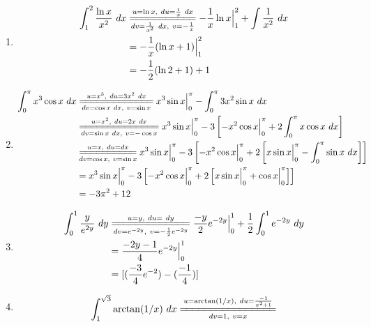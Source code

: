 \documentclass[a4]{article}
\begin{document}
\begin{enumerate}[label={\bf{}\arabic*}.]
\item%
	\begin{align*}
	\int_1^2\frac{\ln x}{x^2}\ dx&\overset{u=\ln x,\ du=\frac{1}{x}\ dx}{\underset{dv=\frac{1}{x^2}\ dx,\ v=-\frac{1}{x}}{=\joinrel=\joinrel=\joinrel=\joinrel=\joinrel=\joinrel=\joinrel=\joinrel=\joinrel=\joinrel=}}-\frac{1}{x}\ln x\Big|_1^2+\int\frac{1}{x^2}\ dx\\
	&=-\frac{1}{x}(\ln x+1)\Big|_1^2\\
	&=-\frac{1}{2}(\ln2+1)+1
	\end{align*}

\item%
	\begin{align*}
	\int_0^\pi x^3\cos x\ dx&\overset{u=x^3,\ du=3x^2\ dx}{\underset{dv=\cos x\ dx,\ v=\sin x}{=\joinrel=\joinrel=\joinrel=\joinrel=\joinrel=\joinrel=\joinrel=\joinrel=\joinrel=\joinrel=\joinrel=\joinrel=}}x^3\sin x\Big|_0^\pi-\int_0^\pi3x^2\sin x\ dx\\
	&\overset{u=x^2,\ du=2x\ dx}{\underset{dv=\sin x\ dx,\ v=-\cos x}{=\joinrel=\joinrel=\joinrel=\joinrel=\joinrel=\joinrel=\joinrel=\joinrel=\joinrel=\joinrel=\joinrel=\joinrel=\joinrel=}}x^3\sin x\Big|_0^\pi-3\left[-x^2\cos x\Big|_0^\pi+2\int_0^\pi x\cos x\ dx\right]\\
	&\overset{u=x,\ du=dx}{\underset{dv=\cos x,\ v=\sin x}{=\joinrel=\joinrel=\joinrel=\joinrel=\joinrel=\joinrel=\joinrel=\joinrel=\joinrel=}}x^3\sin x\Big|_0^\pi-3\left[-x^2\cos x\Big|_0^\pi+2\left[x\sin x\Big|_0^\pi-\int_0^\pi\sin x\ dx\right]\right]\\
	&=x^3\sin x\Big|_0^\pi-3\left[-x^2\cos x\Big|_0^\pi+2\left[x\sin x\Big|_0^\pi+\cos x\Big|_0^\pi\right]\right]\\
	&=-3\pi^2+12
	\end{align*}

\item%
	\begin{align*}
	\int_0^1\frac{y}{e^{2y}}\ dy&\overset{u=y,\ du=\ dy}{\underset{dv=e^{-2y},\ v=-\frac{1}{2}e^{-2y}}{=\joinrel=\joinrel=\joinrel=\joinrel=\joinrel=\joinrel=\joinrel=\joinrel=\joinrel=\joinrel=\joinrel=\joinrel=}}\frac{-y}{2}e^{-2y}\Big|_0^1+\frac{1}{2}\int_0^1e^{-2y}\ dy\\
	&=\frac{-2y-1}{4}e^{-2y}\Big|_0^1\\
	&=[(\frac{-3}{4}e^{-2})-(\frac{-1}{4})]
	\end{align*}

\item%
	\begin{align*}
	\int_1^{\sqrt{3}}\arctan(1/x)\ dx\overset{u=\arctan(1/x),\ du=\frac{-1}{x^2+1}}{\underset{dv=1,\ v=x}{=\joinrel=\joinrel=\joinrel=\joinrel=\joinrel=\joinrel=\joinrel=\joinrel=\joinrel=\joinrel=\joinrel=\joinrel=\joinrel=\joinrel=\joinrel=}}
	\end{align*}



\end{enumerate}
\end{document}
